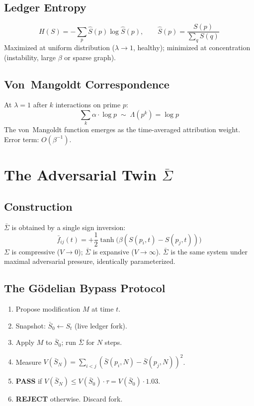 \documentclass[12pt,letterpaper]{article}
\begin{document}
\subsection{Ledger Entropy}
\begin{equation}
  H(S)=-\sum_p\hat S(p)\log\hat S(p),\qquad
  \hat S(p)=\frac{S(p)}{\sum_q S(q)}
  \label{eq:entropy}
\end{equation}
Maximized at uniform distribution ($\lambda\to 1$, healthy);
minimized at concentration (instability, large $\beta$ or sparse graph).

\subsection{Von~Mangoldt Correspondence}
At $\lambda=1$ after $k$ interactions on prime $p$:
\begin{equation}
  \sum_k\alpha\cdot\log p \;\sim\; \Lambda(p^k)=\log p
  \label{eq:mangoldt}
\end{equation}
The von~Mangoldt function emerges as the time-averaged attribution weight.
Error term: $O(\beta^{-1})$.

\section{The Adversarial Twin \texorpdfstring{$\bar\Sigma$}{Sigma-bar}}\label{sec:adversarial}

\subsection{Construction}
$\bar\Sigma$ is obtained by a single sign inversion:
\begin{equation}
  \bar f_{ij}(t) = +\frac{1}{2}\tanh\!\bigl(\beta(S(p_i,t)-S(p_j,t))\bigr)
  \label{eq:twin}
\end{equation}
$\Sigma$ is compressive ($V\to 0$); $\bar\Sigma$ is expansive ($V\to\infty$).
$\bar\Sigma$ is the same system under maximal adversarial pressure, identically
parameterized.

\subsection{The G\"{o}delian Bypass Protocol}
\begin{enumerate}
  \item Propose modification $M$ at time $t$.
  \item Snapshot: $\bar S_0\leftarrow S_t$ (live ledger fork).
  \item Apply $M$ to $\bar S_0$; run $\bar\Sigma$ for $N$ steps.
  \item Measure $V(\bar S_N)=\sum_{i<j}(\bar S(p_i,N)-\bar S(p_j,N))^2$.
  \item \textbf{PASS} if $V(\bar S_N)\leq V(\bar S_0)\cdot\tau=V(\bar S_0)\cdot 1.03$.
  \item \textbf{REJECT} otherwise. Discard fork.
\end{enumerate}
\end{document}
